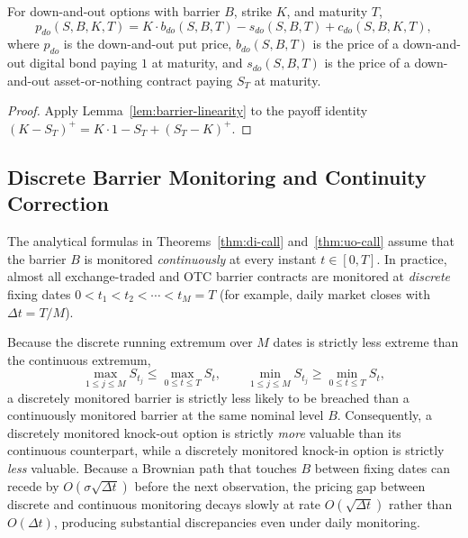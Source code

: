 \begin{theorem}\label{thm:barrier-put-call-parity}
    For down-and-out options with barrier $B$, strike $K$, and maturity $T$,
    \[
    p_{do}(S, B, K, T) = K \cdot b_{do}(S, B, T) - s_{do}(S, B, T) + c_{do}(S, B, K, T),
    \]
    where $p_{do}$ is the down-and-out put price, $b_{do}(S, B, T)$ is the price of a down-and-out digital bond paying $1$ at maturity, and $s_{do}(S, B, T)$ is the price of a down-and-out asset-or-nothing contract paying $S_T$ at maturity.
\end{theorem}
\begin{proof}
    Apply Lemma~\ref{lem:barrier-linearity} to the payoff identity $(K - S_T)^+ = K \cdot 1 - S_T + (S_T - K)^+$.
\end{proof}

\subsection{Discrete Barrier Monitoring and Continuity Correction}

The analytical formulas in Theorems~\ref{thm:di-call} and~\ref{thm:uo-call} assume that the barrier $B$ is monitored \emph{continuously} at every instant $t \in [0, T]$. In practice, almost all exchange-traded and OTC barrier contracts are monitored at \emph{discrete} fixing dates $0 < t_1 < t_2 < \cdots < t_M = T$ (for example, daily market closes with $\Delta t = T / M$).

Because the discrete running extremum over $M$ dates is strictly less extreme than the continuous extremum,
\[
\max_{1 \le j \le M} S_{t_j} \le \max_{0 \le t \le T} S_t, \qquad \min_{1 \le j \le M} S_{t_j} \ge \min_{0 \le t \le T} S_t,
\]
a discretely monitored barrier is strictly less likely to be breached than a continuously monitored barrier at the same nominal level $B$. Consequently, a discretely monitored knock-out option is strictly \emph{more} valuable than its continuous counterpart, while a discretely monitored knock-in option is strictly \emph{less} valuable. Because a Brownian path that touches $B$ between fixing dates can recede by $O(\sigma\sqrt{\Delta t})$ before the next observation, the pricing gap between discrete and continuous monitoring decays slowly at rate $O(\sqrt{\Delta t})$ rather than $O(\Delta t)$, producing substantial discrepancies even under daily monitoring.

